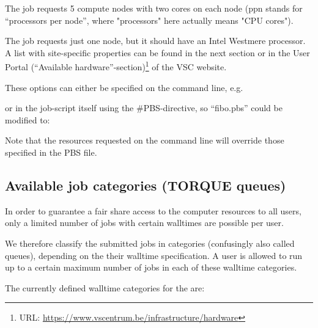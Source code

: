 The job requests 5 compute nodes with two cores on each node (ppn stands for
``processors per node'', where "processors" here actually means "CPU cores"). \\

\begin{prompt}
\end{prompt}

The job requests just one node, but it should have an Intel Westmere processor.
A list with site-specific properties can be found in the next section or in the
User Portal
(``Available hardware''-section)\footnote{URL: \url{https://www.vscentrum.be/infrastructure/hardware}}
of the VSC website.

These options can either be specified on the command line, e.g.

\begin{prompt}
\end{prompt}

or in the job-script itself using the \#PBS-directive, so ``fibo.pbs'' could be modified to:


Note that the resources requested on the command line will override those
specified in the PBS file.

\subsection{Available job categories (TORQUE queues)}

In order to guarantee a fair share access to the computer resources to all
users, only a limited number of jobs with certain walltimes are possible per
user.

We therefore classify the submitted jobs in categories (confusingly also called
queues), depending on the their walltime specification.  A user is allowed to
run up to a certain maximum number of jobs in each of these walltime
categories.

The currently defined walltime categories for the \hpc
are:



